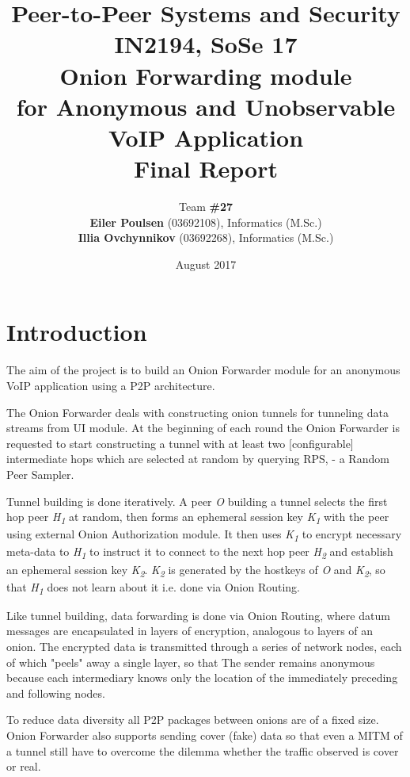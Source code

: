 \documentclass{article}
\title{Peer-to-Peer Systems and Security \\
        \large{IN2194, SoSe 17} \\
        \huge{Onion Forwarding module} \\
        \small{for Anonymous and Unobservable VoIP Application} \\
        \bigbreak
        \large{\textbf{Final Report}}}
\author{Team \textbf{\#27} \\
\textbf{Eiler Poulsen} (03692108), Informatics (M.Sc.) \\
\textbf{Illia Ovchynnikov} (03692268), Informatics (M.Sc.)}
\date{August 2017}
\begin{document}
\null
\nointerlineskip
\vfill
\let\snewpage \newpage
\let\newpage \relax
\maketitle
\let \newpage \snewpage
\vfill 
\break

\hypersetup{linkcolor=black} %
\tableofcontents
\hypersetup{linkcolor=blue}
\break

\section{Introduction}
The aim of the project is to build an Onion Forwarder module for an anonymous VoIP application using a P2P architecture.

The Onion Forwarder deals with constructing onion tunnels for tunneling data streams from UI module. At the beginning of each round the Onion Forwarder is requested to start constructing a tunnel with at least two [configurable] intermediate hops which are selected at random by querying RPS, - a Random Peer Sampler.

Tunnel building is done iteratively. A peer \textit{O} building a tunnel selects the first hop peer \textit{H\textsubscript{1}} at random, then forms an ephemeral session key \textit{K\textsubscript{1}} with the peer using external Onion Authorization module. It then uses \textit{K\textsubscript{1}} to encrypt necessary meta-data to \textit{H\textsubscript{1}} to instruct it to connect to the next hop peer \textit{H\textsubscript{2}} and establish an ephemeral session key \textit{K\textsubscript{2}}. \textit{K\textsubscript{2}} is generated by the hostkeys of \textit{O} and \textit{K\textsubscript{2}}, so that \textit{H\textsubscript{1}} does not learn about it i.e. done via Onion Routing.

Like tunnel building, data forwarding is done via Onion Routing, where datum messages are encapsulated in layers of encryption, analogous to layers of an onion. The encrypted data is transmitted through a series of network nodes, each of which "peels" away a single layer, so that The sender remains anonymous because each intermediary knows only the location of the immediately preceding and following nodes.

To reduce data diversity all P2P packages between onions are of a fixed size. Onion Forwarder also supports sending cover (fake) data so that even a MITM of a tunnel still have to overcome the dilemma whether the traffic observed is cover or real.
\end{document}
